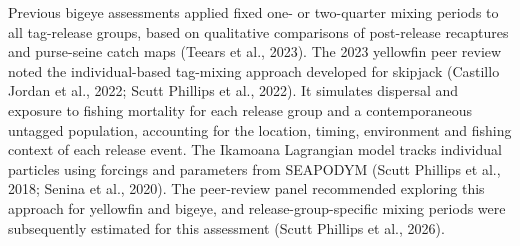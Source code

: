 \documentclass[
  english,
  a4paper,
  a4paper,
  11pt]{SCreport}
\begin{document}
Previous bigeye assessments applied fixed one- or two-quarter mixing
periods to all tag-release groups, based on qualitative comparisons of
post-release recaptures and purse-seine catch maps (Teears et al.,
2023). The 2023 yellowfin peer review noted the individual-based
tag-mixing approach developed for skipjack (Castillo Jordan et al.,
2022; Scutt Phillips et al., 2022). It simulates dispersal and exposure
to fishing mortality for each release group and a contemporaneous
untagged population, accounting for the location, timing, environment
and fishing context of each release event. The Ikamoana Lagrangian model
tracks individual particles using forcings and parameters from SEAPODYM
(Scutt Phillips et al., 2018; Senina et al., 2020). The peer-review
panel recommended exploring this approach for yellowfin and bigeye, and
release-group-specific mixing periods were subsequently estimated for
this assessment (Scutt Phillips et al., 2026).
\end{document}
